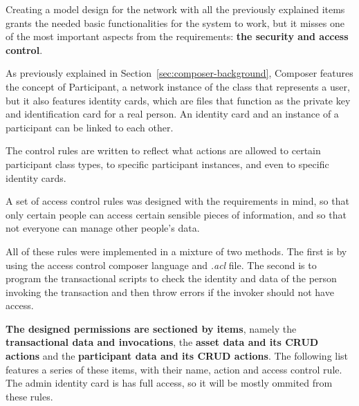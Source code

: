 Creating a model design for the network with all the previously explained items grants the needed basic functionalities for the system to work, but it misses one of the most important aspects from the requirements: \textbf{the security and access control}.

As previously explained in Section~\ref{sec:composer-background}, Composer features the concept of Participant, a network instance of the class that represents a user, but it also features identity cards, which are files that function as the private key and identification card for a real person. An identity card and an instance of a participant can be linked to each other.

The control rules are written to reflect what actions are allowed to certain participant class types, to specific participant instances, and even to specific identity cards. 


A set of access control rules was designed with the requirements in mind, so that only certain people can access certain sensible pieces of information, and so that not everyone can manage other people's data. 

 All of these rules were implemented in a mixture of two methods. The first is by using the access control composer language and \textit{.acl} file. The second is to program the transactional scripts to check the identity and data of the person invoking the transaction and then throw errors if the invoker should not have access.

 \textbf{The designed permissions are sectioned by items}, namely the \textbf{transactional data and invocations}, the \textbf{asset data and its CRUD actions} and the \textbf{participant data and its CRUD actions}. The following list features a series of these items, with their name, action and access control rule. The admin identity card is has full access, so it will be mostly ommited from these rules.

